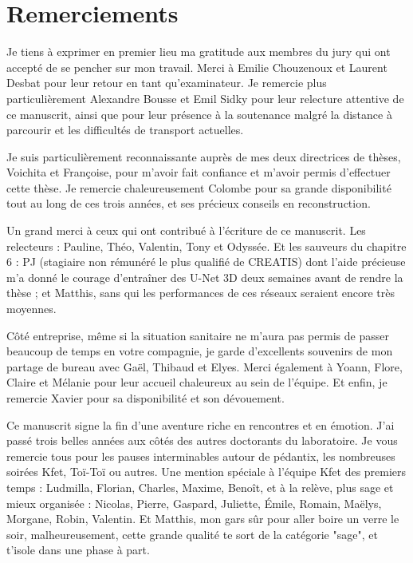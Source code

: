 \chapter*{Remerciements}

\thispagestyle{empty}

Je tiens à exprimer en premier lieu ma gratitude aux membres du jury qui ont accepté de se pencher sur mon travail. Merci à Emilie Chouzenoux et Laurent Desbat pour leur retour en tant qu’examinateur. Je remercie plus particulièrement Alexandre Bousse et Emil Sidky pour leur relecture attentive de ce manuscrit, ainsi que pour leur présence à la soutenance malgré la distance à parcourir et les difficultés de transport actuelles. 

Je suis particulièrement reconnaissante auprès de mes deux directrices de thèses, Voichita et Françoise, pour m’avoir fait confiance et m’avoir permis d’effectuer cette thèse. Je remercie chaleureusement Colombe pour sa grande disponibilité tout au long de ces trois années, et ses précieux conseils en reconstruction. 

Un grand merci à ceux qui ont contribué à l'écriture de ce manuscrit. Les relecteurs : Pauline, Théo, Valentin, Tony et Odyssée. Et les sauveurs du chapitre 6 : PJ (stagiaire non rémunéré le plus qualifié de CREATIS) dont l'aide précieuse m'a donné le courage d'entraîner des U-Net 3D deux semaines avant de rendre la thèse ; et Matthis, sans qui les performances de ces réseaux seraient encore très moyennes. 

Côté entreprise, même si la situation sanitaire ne m’aura pas permis de passer beaucoup de temps en votre compagnie, je garde d'excellents souvenirs de mon partage de bureau avec Gaël, Thibaud et Elyes. Merci également à Yoann, Flore, Claire et Mélanie pour leur accueil chaleureux au sein de l’équipe. Et enfin, je remercie Xavier pour sa disponibilité et son dévouement.

Ce manuscrit signe la fin d'une aventure riche en rencontres et en émotion. J'ai passé trois belles années aux côtés des autres doctorants du laboratoire. Je vous remercie tous pour les pauses interminables autour de pédantix, les nombreuses soirées Kfet, Toï-Toï ou autres. Une mention spéciale à l'équipe Kfet des premiers temps : Ludmilla, Florian, Charles, Maxime, Benoît, et à la relève, plus sage et mieux organisée : Nicolas, Pierre, Gaspard, Juliette, Émile, Romain, Maëlys, Morgane, Robin, Valentin. Et Matthis, mon gars sûr pour aller boire un verre le soir, malheureusement, cette grande qualité te sort de la catégorie "sage", et t'isole dans une phase à part.

